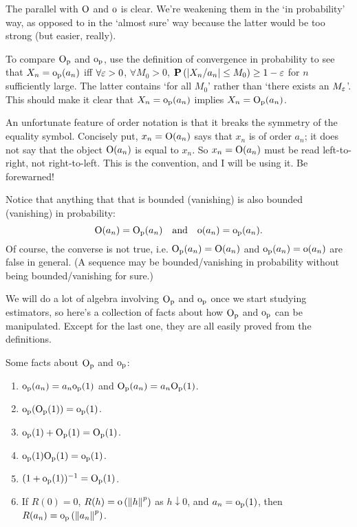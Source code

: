 \documentclass[11pt,letterpaper,reqno,oneside]{article}
\begin{document}
The parallel with $\OO$ and $\oo$ is clear. We're weakening them in the `in probability' way, as opposed to in the `almost sure' way because the latter would be too strong (but easier, really).


To compare $\Op$ and $\op$, use the definition of convergence in probability to see that $X_n = \op(a_n)$ iff $\forall \eps>0$, $\forall M_0 > 0$, $\PP\left( \abs*{X_n/a_n} \leq M_0 \right) \geq 1-\eps$ for $n$ sufficiently large. The latter contains `for all $M_0$' rather than `there exists an $M_\eps$'. This should make it clear that $X_n = \op(a_n)$ implies $X_n = \Op(a_n)$.

An unfortunate feature of order notation is that it breaks the symmetry of the equality symbol. Concisely put, $x_n = \OO(a_n)$ says that $x_n$ is of order $a_n$; it does not say that the object $\OO(a_n)$ is equal to $x_n$. So $x_n = \OO(a_n)$ must be read left-to-right, not right-to-left. This is the convention, and I will be using it. Be forewarned!

Notice that anything that that is bounded (vanishing) is also bounded (vanishing) in probability:
%
\begin{equation*}
	\OO(a_n) = \Op(a_n)
	\quad\text{and}\quad
	\oo(a_n) = \op(a_n) .
\end{equation*}
%
Of course, the converse is not true, i.e. $\Op(a_n) = \OO(a_n)$ and $\op(a_n) = \oo(a_n)$ are false in general. (A sequence may be bounded/vanishing in probability without being bounded/vanishing for sure.)

We will do a lot of algebra involving $\Op$ and $\op$ once we start studying estimators, so here's a collection of facts about how $\Op$ and $\op$ can be manipulated. Except for the last one, they are all easily proved from the definitions.
%
\begin{proposition}
	Some facts about $\Op$ and $\op$:
	\begin{enumerate}

		\item $\op(a_n) = a_n \op(1)$ and $\Op(a_n) = a_n \Op(1)$.

		\item $\op(\Op(1))=\op(1)$.

		\item $\op(1) + \Op(1) = \Op(1)$.

		\item $\op(1) \Op(1) = \op(1)$.

		\item $( 1 + \op(1) )^{-1} = \Op(1)$.

		\item If $R(0)=0$, $R(h) = \oo\left( \norm*{h}^p \right)$ as $h \downarrow 0$, and $a_n = \op(1)$, then $R(a_n) = \op\left( \norm*{a_n}^p \right)$.

	\end{enumerate}
\end{proposition}
\end{document}
